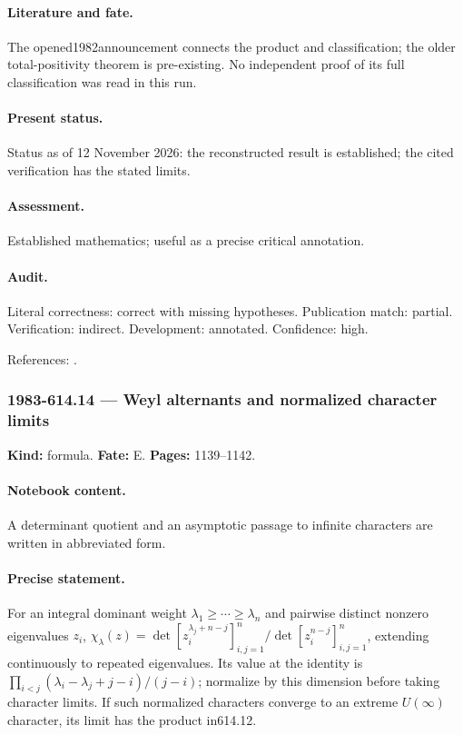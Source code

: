 \paragraph{Literature and fate.} The opened1982announcement connects the product and classification; the older total-positivity theorem is pre-existing. No independent proof of its full classification was read in this run.

\paragraph{Present status.} Status as of 12 November 2026: the reconstructed result is established; the cited verification has the stated limits.

\paragraph{Assessment.} Established mathematics; useful as a precise critical annotation.

\paragraph{Audit.} Literal correctness: correct with missing hypotheses. Publication match: partial. Verification: indirect. Development: annotated. Confidence: high.

\noindent References: \citep{vershikkerov1982unitary}.\par

\subsubsection{1983-614.14 --- Weyl alternants and normalized character limits}

\label{item:1983-614.14}

\noindent\textbf{Kind:} formula. \textbf{Fate:} E. \textbf{Pages:} 1139--1142.\par

\paragraph{Notebook content.} A determinant quotient and an asymptotic passage to infinite characters are written in abbreviated form.

\paragraph{Precise statement.} For an integral dominant weight $\lambda_1\ge\cdots\ge\lambda_n$ and pairwise distinct nonzero eigenvalues $z_i$, $\chi_\lambda(z)=\det[z_i^{\lambda_j+n-j}]_{i,j=1}^n/\det[z_i^{n-j}]_{i,j=1}^n$, extending continuously to repeated eigenvalues. Its value at the identity is $\prod_{i<j}(\lambda_i-\lambda_j+j-i)/(j-i)$; normalize by this dimension before taking character limits. If such normalized characters converge to an extreme $U(\infty)$ character, its limit has the product in614.12.

